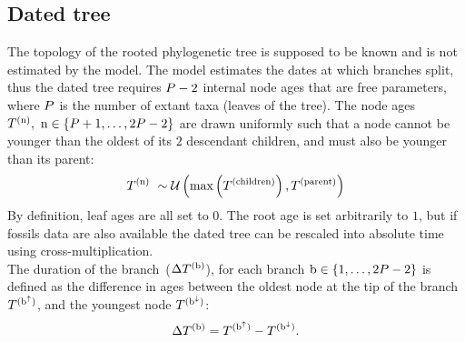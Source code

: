 \subsection{Dated tree}
The topology of the rooted phylogenetic tree is supposed to be known and is not estimated by the model.
The model estimates the dates at which branches split, thus the dated tree requires $P - 2$ internal node ages that are free parameters, where $P$ is the number of extant taxa (leaves of the tree).
The node ages $T^{(\text{n})},\ \text{n} \in \{P + 1, \hdots, 2 P - 2\}$ are drawn uniformly such that a node cannot be younger than the oldest of its $2$ descendant children, and must also be younger than its parent:
\begin{equation}
    \label{eq:Distribage}
    \age\nodeexp \ \sim \mathcal{U}\left( \text{max}\left(\age^{(\text{children})} \right), \age^{(\text{parent})} \right)
\end{equation}
By definition, leaf ages are all set to $0$. The root age is set arbitrarily to $1$, but if fossils data are also available the dated tree can be rescaled into absolute time using cross-multiplication.\\
The duration of the branch~($\Delta T^{(\text{b})}$), for each branch $\text{b} \in \{1, \hdots, 2 P - 2\}$ is defined as the difference in ages between the oldest node at the tip of the branch $T^{(\text{b}^{\uparrow})}$, and the youngest node $T^{(\text{b}^{\downarrow})}$:
\begin{equation}
    \label{eq:ageTobranchtime}
    \branchtime\branchexp = \age^{(\nodeUp)} - \age^{(\nodeDown)}.
\end{equation}

